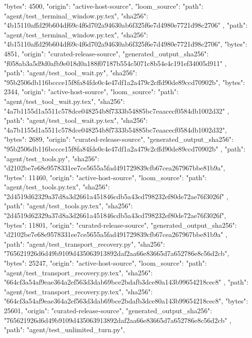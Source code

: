 {{      "bytes": 4500,
      "origin": "active-host-source",
      "loom_source": {
        "path": "agent/test_terminal_window.py.tex",
        "sha256": "4b15110affd29b604df69c4f6d702a94630ab6f325f6e7d4980e7721d98c2706"
      }
    },
    {
      "path": "agent/test_terminal_window.py.tex",
      "sha256": "4b15110affd29b604df69c4f6d702a94630ab6f325f6e7d4980e7721d98c2706",
      "bytes": 4851,
      "origin": "curated-release-source",
      "generated_output_sha256": "f058ab3a5d9d0afb9e018d0a188f07187b554c5071c8b54e4c191ef34005d911"
    },
    {
      "path": "agent/test_tool_wait.py",
      "sha256": "95b2506db116bccce15f8fa84fde0c4e47df1a2a479c2cffd90de89ccd70902b",
      "bytes": 2344,
      "origin": "active-host-source",
      "loom_source": {
        "path": "agent/test_tool_wait.py.tex",
        "sha256": "4a7b1155d1a5511c578dce048254b8f7333b54885bc7eaacecf0584db1002d32"
      }
    },
    {
      "path": "agent/test_tool_wait.py.tex",
      "sha256": "4a7b1155d1a5511c578dce048254b8f7333b54885bc7eaacecf0584db1002d32",
      "bytes": 2689,
      "origin": "curated-release-source",
      "generated_output_sha256": "95b2506db116bccce15f8fa84fde0c4e47df1a2a479c2cffd90de89ccd70902b"
    },
    {
      "path": "agent/test_tools.py",
      "sha256": "d2102be7e68e9578331ee7ce5655a5fad491729839cfb67cea267967bbe81b9a",
      "bytes": 11460,
      "origin": "active-host-source",
      "loom_source": {
        "path": "agent/test_tools.py.tex",
        "sha256": "2d4519d62329a37d8a3d2661a451846cdb5a43cd798232ef80de72ae76f3026f"
      }
    },
    {
      "path": "agent/test_tools.py.tex",
      "sha256": "2d4519d62329a37d8a3d2661a451846cdb5a43cd798232ef80de72ae76f3026f",
      "bytes": 11801,
      "origin": "curated-release-source",
      "generated_output_sha256": "d2102be7e68e9578331ee7ce5655a5fad491729839cfb67cea267967bbe81b9a"
    },
    {
      "path": "agent/test_transport_recovery.py",
      "sha256": "765621926d6d49b9109d435063913892daf2aa66e83665d7a652786e8c56d2cb",
      "bytes": 25247,
      "origin": "active-host-source",
      "loom_source": {
        "path": "agent/test_transport_recovery.py.tex",
        "sha256": "664cf3a54af9eae364a2ef563d3dab69bce2bdafb3dce80a143b99654218cec8"
      }
    },
    {
      "path": "agent/test_transport_recovery.py.tex",
      "sha256": "664cf3a54af9eae364a2ef563d3dab69bce2bdafb3dce80a143b99654218cec8",
      "bytes": 25601,
      "origin": "curated-release-source",
      "generated_output_sha256": "765621926d6d49b9109d435063913892daf2aa66e83665d7a652786e8c56d2cb"
    },
    {
      "path": "agent/test_unlimited_turn.py",
}}
